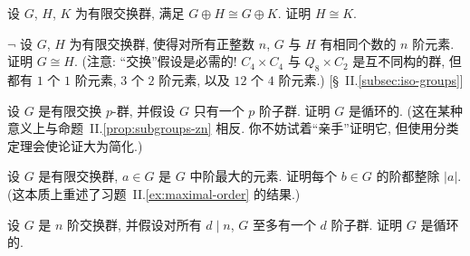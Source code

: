 \begin{prob}
\label{ex:abelian-cancellation}
设 $G$, $H$, $K$ 为有限交换群, 满足 $G \oplus H \cong G \oplus K$. 证明 $H \cong K$.
\end{prob}

\begin{prob}
\label{ex:abelian-same-order-count}
$\neg$ 设 $G$, $H$ 为有限交换群, 使得对所有正整数 $n$, $G$ 与 $H$ 有相同个数的 $n$ 阶元素. 证明 $G \cong H$. (注意: ``交换''假设是必需的! $C_4 \times C_4$ 与 $Q_8 \times C_2$ 是互不同构的群, 但都有 $1$ 个 $1$ 阶元素, $3$ 个 $2$ 阶元素, 以及 $12$ 个 $4$ 阶元素.) [\S~II.\ref{subsec:iso-groups}]
\end{prob}

\begin{prob}
\label{ex:abelian-one-subgroup-p}
设 $G$ 是有限交换 $p$-群, 并假设 $G$ 只有一个 $p$ 阶子群. 证明 $G$ 是循环的. (这在某种意义上与命题~II.\ref{prop:subgroups-zn} 相反. 你不妨试着``亲手''证明它, 但使用分类定理会使论证大为简化.)
\end{prob}

\begin{prob}
\label{ex:abelian-max-order}
设 $G$ 是有限交换群, $a \in G$ 是 $G$ 中阶最大的元素. 证明每个 $b \in G$ 的阶都整除 $|a|$. (这本质上重述了习题~II.\ref{ex:maximal-order} 的结果.)
\end{prob}

\begin{prob}
\label{ex:abelian-unique-subgroup-d}
设 $G$ 是 $n$ 阶交换群, 并假设对所有 $d \mid n$, $G$ 至多有一个 $d$ 阶子群. 证明 $G$ 是循环的.
\end{prob}
